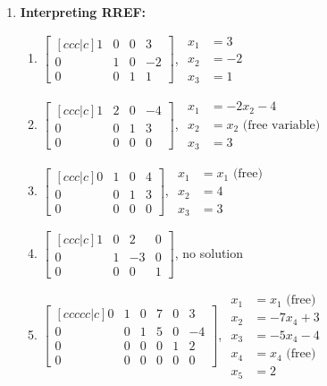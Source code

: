 \begin{multicols}{2}
\begin{enumerate}
\item \textbf{Interpreting RREF:} 
\begin{enumerate}
	\item 
$
\begin{bmatrix}[ccc|c]
 1 & 0 & 0 & 3 \\
 0 & 1 & 0 & -2 \\
 0 & 0 & 1 & 1
\end{bmatrix}$,
$\begin{array}{rl}
x_1&=3\\ 
x_2&=-2\\
x_3&=1
\end{array}$
	\item 
$
\begin{bmatrix}[ccc|c]
 1 & 2 & 0 & -4 \\
 0 & 0 & 1 & 3 \\
 0 & 0 & 0 & 0
\end{bmatrix}
$,
$\begin{array}{rl}
x_1&=-2x_2-4 \\
x_2&=x_2 \text{ (free variable)} \\
x_3&=3
\end{array}$


	\item 
$
\begin{bmatrix}[ccc|c]
 0 & 1 & 0 & 4 \\
 0 & 0 & 1 & 3 \\
 0 & 0 & 0 & 0
\end{bmatrix}
$,
$
\begin{array}{rl}
x_1&=x_1 \text{ (free)} \\
x_2&=4 \\
x_3&=3
\end{array}
$


	\item 
$
\begin{bmatrix}[ccc|c]
 1 & 0 & 2 & 0 \\
 0 & 1 & -3 & 0 \\
 0 & 0 & 0 & 1
\end{bmatrix}
$,
no solution


	\item 
$
\begin{bmatrix}[ccccc|c]
 0 & 1 & 0 & 7 & 0 & 3 \\
 0 & 0 & 1 & 5 & 0 & -4 \\
 0 & 0 & 0 & 0 & 1 & 2 \\
 0 & 0 & 0 & 0 & 0 & 0
\end{bmatrix}
$,
$\begin{array}{rl}
x_1&=x_1 \text{ (free)}\\
x_2&=-7x_4+3\\
x_3&=-5x_4-4\\
x_4&=x_4 \text{ (free)}\\
x_5&=2
\end{array}$



\end{enumerate}
\end{enumerate}
\end{multicols}
